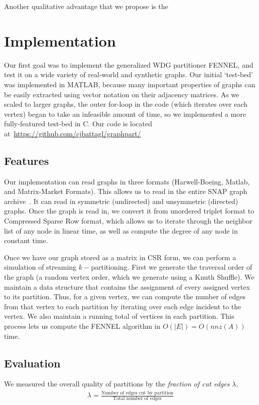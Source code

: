 \documentclass[11pt]{article}
\begin{document}
Another qualitative advantage that we propose is the

\section{Implementation}
Our first goal was to implement the generalized WDG partitioner FENNEL, and test it on a wide variety of real-world and synthetic graphs. Our initial `test-bed' was implemented in MATLAB, because many important properties of graphs can be easily extracted using vector notation on their adjacency matrices. As we scaled to larger graphs, the outer for-loop in the code (which iterates over each vertex) began to take an infeasible amount of time, so we implemented a more fully-featured test-bed in C. Our code is located at~\url{https://github.com/cjbattagl/graphpart/}

\subsection{Features}
Our implementation can read graphs in three formats (Harwell-Boeing, Matlab, and Matrix-Market Formats). This allows us to read in the entire SNAP graph archive~\cite{Leskovec-data}. It can read in symmetric (undirected) and unsymmetric (directed) graphs. Once the graph is read in, we convert it from unordered triplet format to Compressed Sparse Row format, which allows us to iterate through the neighbor list of any node in linear time, as well as compute the degree of any node in constant time.

Once we have our graph stored as a matrix in CSR form, we can perform a simulation of streaming $k-$partitioning. First we generate the traversal order of the graph (a random vertex order, which we generate using a Knuth Shuffle). We maintain a data structure that contains the assignment of every assigned vertex to its partition. Thus, for a given vertex, we can compute the number of edges from that vertex to each partition by iterating over each edge incident to the vertex. We also maintain a running total of vertices in each partition. This process lets us compute the FENNEL algorithm in $O(|E|)=O(nnz(A))$ time. 

\subsection{Evaluation}

We measured the overall quality of partitions by the \textit{fraction of cut edges} $\lambda$.
\begin{align}\lambda = \frac{\text{Number of edges cut by partition}}{\text{Total number of edges}}\end{align}
\end{document}
